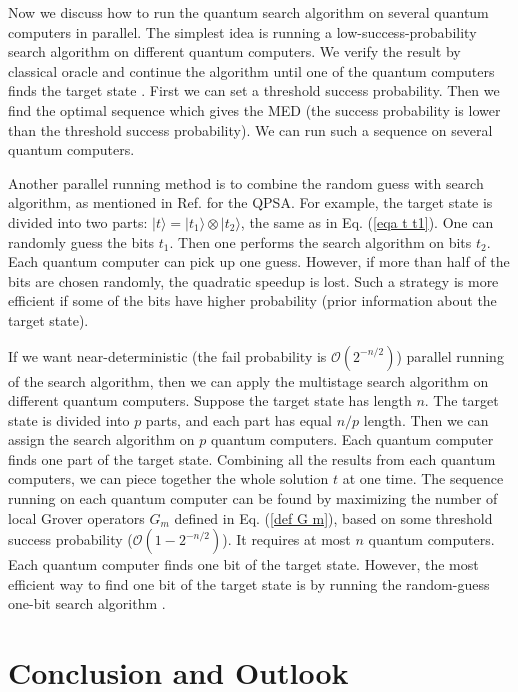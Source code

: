 \documentclass[%
 twocolumn,
 10pt,
 superscriptaddress,
 longbibliography,
 amsmath,amssymb,
 aps,
 pra,
floatfix,
]{revtex4-1}
\begin{document}
Now we discuss how to run the quantum search algorithm on several quantum computers in parallel. The simplest idea is running a low-success-probability search algorithm on different quantum computers. We verify the result by classical oracle and continue the algorithm until one of the quantum computers finds the target state \cite{GWC00}. First we can set a threshold success probability. Then we find the optimal sequence which gives the MED (the success probability is lower than the threshold success probability). We can run such a sequence on several quantum computers.

Another parallel running method is to combine the random guess with search algorithm, as mentioned in Ref. \cite{Korepin05} for the QPSA. For example, the target state is divided into two parts: $|t\rangle=|t_1\rangle\otimes|t_2\rangle$, the same as in Eq. (\ref{eqa t t1}). One can randomly guess the bits $t_1$. Then one performs the search algorithm on bits $t_2$. Each quantum computer can pick up one guess. However, if more than half of the bits are chosen randomly, the quadratic speedup is lost. Such a strategy is more efficient if some of the bits have higher probability (prior information about the target state).

If we want near-deterministic (the fail probability is $\mathcal O(2^{-n/2})$) parallel running of the search algorithm, then we can apply the multistage search algorithm on different quantum computers. Suppose the target state has length $n$. The target state is divided into $p$ parts, and each part has equal $n/p$ length. Then we can assign the search algorithm on $p$ quantum computers. Each quantum computer finds one part of the target state. Combining all the results from each quantum computers, we can piece together the whole solution $t$ at one time. The sequence running on each quantum computer can be found by maximizing the number of local Grover operators $G_m$ defined in Eq. (\ref{def G m}), based on some threshold success probability ($\mathcal O(1-2^{-n/2})$). It requires at most $n$ quantum computers. Each quantum computer finds one bit of the target state. However, the most efficient way to find one bit of the target state is by running the random-guess one-bit search algorithm \cite{Korepin05}.

\section{\label{sec:conclusion}Conclusion and Outlook}
\end{document}
